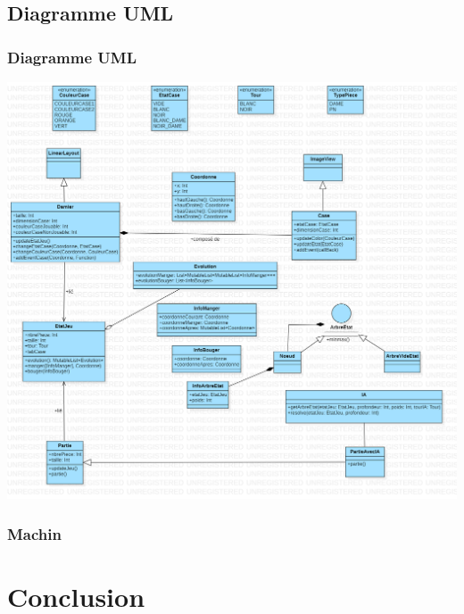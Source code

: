 \documentclass{beamer}
\begin{document}
\subsection{Diagramme UML}
\begin{frame}
  \frametitle{Diagramme UML}
  \begin{center}
    \includegraphics[scale=0.15]{diagramme_android.png}
  \end{center}
\end{frame}
%
%
\begin{frame}
  \frametitle{Machin}
\end{frame}
%
%
\section{Conclusion}
%
%
%
%
\end{document}
